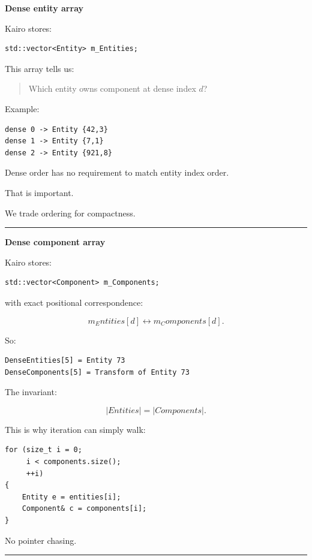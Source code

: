 \textbf{Dense entity array}

Kairo stores:

\begin{verbatim}
std::vector<Entity> m_Entities;
\end{verbatim}

This array tells us:

\begin{quote}
Which entity owns component at dense index \(d\)?
\end{quote}

Example:

\begin{verbatim}
dense 0 -> Entity {42,3}
dense 1 -> Entity {7,1}
dense 2 -> Entity {921,8}
\end{verbatim}

Dense order has no requirement to match entity index order.

That is important.

We trade ordering for compactness.

\begin{center}\rule{0.5\linewidth}{0.5pt}\end{center}

\textbf{Dense component array}

Kairo stores:

\begin{verbatim}
std::vector<Component> m_Components;
\end{verbatim}

with exact positional correspondence:

\[
m_Entities[d]
\leftrightarrow
m_Components[d].
\]

So:

\begin{verbatim}
DenseEntities[5] = Entity 73
DenseComponents[5] = Transform of Entity 73
\end{verbatim}

The invariant:

\[
|Entities|=|Components|.
\]

This is why iteration can simply walk:

\begin{verbatim}
for (size_t i = 0;
     i < components.size();
     ++i)
{
    Entity e = entities[i];
    Component& c = components[i];
}
\end{verbatim}

No pointer chasing.

\begin{center}\rule{0.5\linewidth}{0.5pt}\end{center}

